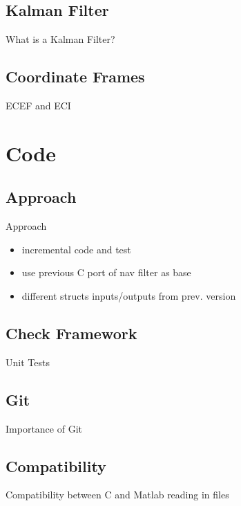 \documentclass[aspectratio=169,handout]{beamer}
\begin{document}
\subsection{Kalman Filter}
	\begin{frame}{What is a Kalman Filter?}
	\end{frame}

\subsection{Coordinate Frames}
	\begin{frame}{ECEF and ECI}
	\cite{Waddington1959}
	\cite{VanDyk1989}
	\end{frame}

\section{Code}%

\subsection{Approach}
	\begin{frame}{Approach}
		\begin{itemize}
			\item incremental code and test
			\item use previous C port of nav filter as base
			\item different structs inputs/outputs from prev. version
		\end{itemize}
	\end{frame}

\subsection{Check Framework}
	\begin{frame}{Unit Tests}
	\end{frame}

\subsection{Git}
	\begin{frame}{Importance of Git}
	\end{frame}

\subsection{Compatibility}
	\begin{frame}{Compatibility between C and Matlab}
		reading in files
	\end{frame}
\end{document}
